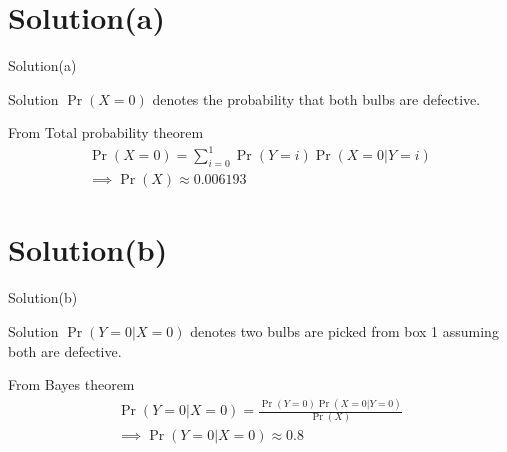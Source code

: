 \documentclass{beamer}
\providecommand{\pr}[1]{\ensuremath{\Pr\left(#1\right)}}
\begin{document}
\section{Solution(a)}
     \begin{frame}{Solution(a)}
     \begin{block}{Solution}
     $\pr{X=0}$ denotes the probability that both bulbs are defective.\\
     \end{block}
      From Total probability theorem
        \begin{align}
        \pr{X=0}=\sum_{i=0}^1 \pr{Y=i}\pr{X=0|Y=i}\\
            \implies \boxed{\pr{X}\approx 0.006193}
        \end{align}
     \end{frame}
     
     
     \section{Solution(b)}
     \begin{frame}{Solution(b)}
     \begin{block}{Solution}
     $\pr{Y=0|X=0}$ denotes two bulbs are picked from box 1 assuming both are defective.
     \end{block}
     From Bayes theorem
        \begin{align}
            \pr{Y=0|X=0}=\frac{\pr{Y=0}\pr{X=0|Y=0}}{\pr{X}}\\
            \implies \boxed{\pr{Y=0|X=0}\approx0.8}
        \end{align}
     \end{frame}
\end{document}
